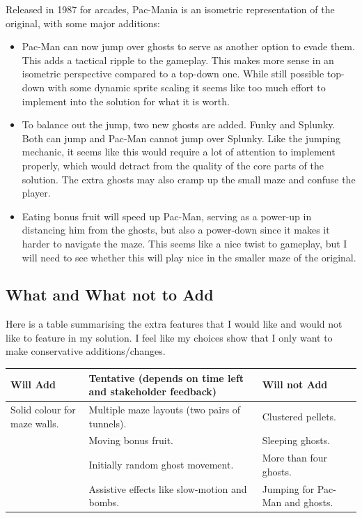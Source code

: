 \documentclass[letterpaper, 11pt]{article}
\begin{document}
Released in 1987 for arcades, Pac-Mania is an isometric representation of the original, with some major additions:

\begin{itemize}
\item Pac-Man can now jump over ghosts to serve as another option to evade them.
This adds a tactical ripple to the gameplay.
This makes more sense in an isometric perspective compared to a top-down one.
While still possible top-down with some dynamic sprite scaling it seems like too much effort to implement into the solution for what it is worth.

\item To balance out the jump, two new ghosts are added.
Funky and Splunky.
Both can jump and Pac-Man cannot jump over Splunky.
Like the jumping mechanic, it seems like this would require a lot of attention to implement properly, which would detract from the quality of the core parts of the solution.
The extra ghosts may also cramp up the small maze and confuse the player.

\item Eating bonus fruit will speed up Pac-Man, serving as a power-up in distancing him from the ghosts, but also a power-down since it makes it harder to navigate the maze.
This seems like a nice twist to gameplay, but I will need to see whether this will play nice in the smaller maze of the original.
\end{itemize}

\subsection{What and What not to Add}
\label{sec:org1d98bae}
Here is a table summarising the extra features that I would like and would not like to feature in my solution.
I feel like my choices show that I only want to make conservative additions/changes.

\begin{center}
\begin{tabularx}{\textwidth}{XXX}
\hline
\textbf{Will Add} & \textbf{Tentative (depends on time left and stakeholder feedback)} & \textbf{Will not Add}\\[0pt]
\hline
Solid colour for maze walls. & Multiple maze layouts (two pairs of tunnels). & Clustered pellets.\\[0pt]
\hline
 & Moving bonus fruit. & Sleeping ghosts.\\[0pt]
\hline
 & Initially random ghost movement. & More than four ghosts.\\[0pt]
\hline
 & Assistive effects like slow-motion and bombs. & Jumping for Pac-Man and ghosts.\\[0pt]
\hline
\end{tabularx}
\end{center}
\end{document}
